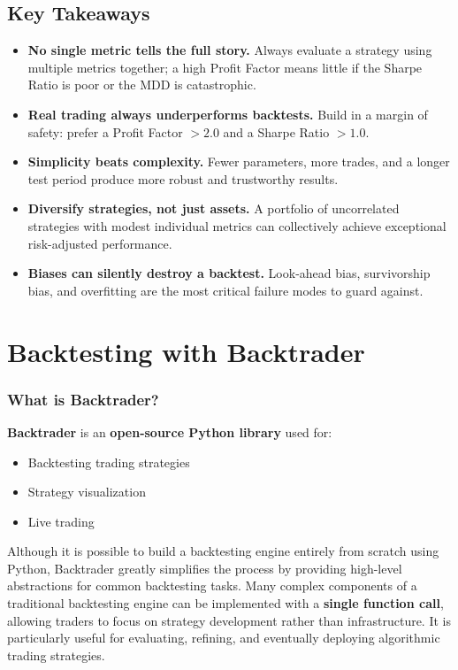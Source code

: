\documentclass[12pt,openany]{book}
\begin{document}
\subsection{Key Takeaways}

\begin{itemize}[leftmargin=*]
    \item \textbf{No single metric tells the full story.} Always evaluate a strategy using multiple metrics together; a high Profit Factor means little if the Sharpe Ratio is poor or the MDD is catastrophic.
    \item \textbf{Real trading always underperforms backtests.} Build in a margin of safety: prefer a Profit Factor $> 2.0$ and a Sharpe Ratio $> 1.0$.
    \item \textbf{Simplicity beats complexity.} Fewer parameters, more trades, and a longer test period produce more robust and trustworthy results.
    \item \textbf{Diversify strategies, not just assets.} A portfolio of uncorrelated strategies with modest individual metrics can collectively achieve exceptional risk-adjusted performance.
    \item \textbf{Biases can silently destroy a backtest.} Look-ahead bias, survivorship bias, and overfitting are the most critical failure modes to guard against.
\end{itemize}

\section{Backtesting with Backtrader}

\subsubsection{What is Backtrader?}

\textbf{Backtrader} is an \textbf{open-source Python library} used for:

\begin{itemize}[leftmargin=*]
    \item Backtesting trading strategies
    \item Strategy visualization
    \item Live trading
\end{itemize}

Although it is possible to build a backtesting engine entirely from scratch using Python, Backtrader greatly simplifies the process by providing high-level abstractions for common backtesting tasks. Many complex components of a traditional backtesting engine can be implemented with a \textbf{single function call}, allowing traders to focus on strategy development rather than infrastructure. It is particularly useful for evaluating, refining, and eventually deploying algorithmic trading strategies.
\end{document}
